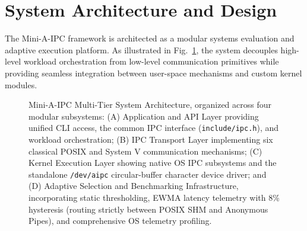 \section{System Architecture and Design}
\label{sec:architecture}

The Mini-A-IPC framework is architected as a modular systems evaluation and adaptive execution platform. As illustrated in Fig.~\ref{fig:architecture}, the system decouples high-level workload orchestration from low-level communication primitives while providing seamless integration between user-space mechanisms and custom kernel modules.

\begin{figure}[!t]
\centering

\caption{Mini-A-IPC Multi-Tier System Architecture, organized across four modular subsystems: (A) Application and API Layer providing unified CLI access, the common IPC interface (\texttt{include/ipc.h}), and workload orchestration; (B) IPC Transport Layer implementing six classical POSIX and System V communication mechanisms; (C) Kernel Execution Layer showing native OS IPC subsystems and the standalone \texttt{/dev/aipc} circular-buffer character device driver; and (D) Adaptive Selection and Benchmarking Infrastructure, incorporating static thresholding, EWMA latency telemetry with 8\% hysteresis (routing strictly between POSIX SHM and Anonymous Pipes), and comprehensive OS telemetry profiling.}
\label{fig:architecture}
\end{figure}


